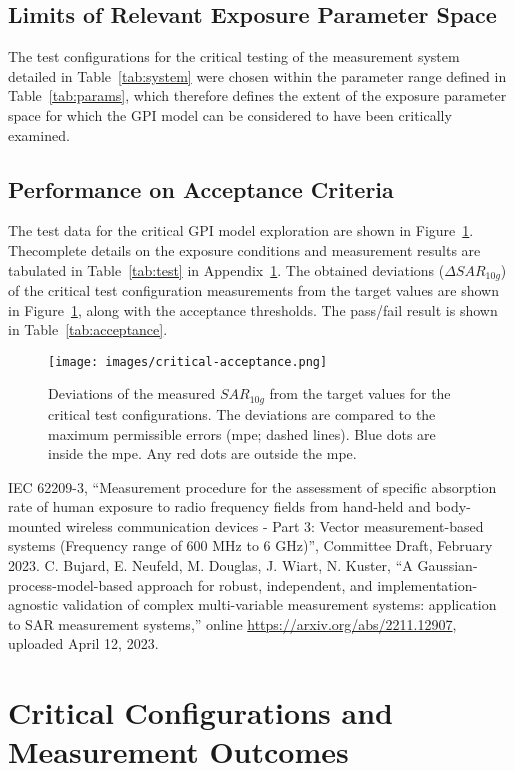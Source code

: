 \documentclass{article}
\begin{document}
\subsection{Limits of Relevant Exposure Parameter Space}
The test configurations for the critical testing of the measurement system detailed in Table~\ref{tab:system} were chosen within the parameter range defined in Table~\ref{tab:params}, which therefore defines the extent of the exposure parameter space for which the GPI model can be considered to have been critically examined.



\FloatBarrier
\subsection{Performance on Acceptance Criteria}
The test data for the critical GPI model exploration are shown in Figure~\ref{fig:critical-acc}. Thecomplete details on the exposure conditions and measurement results are tabulated in Table~\ref{tab:test} in Appendix~\ref{sec:critical-data}.
The obtained deviations ($\Delta SAR_{10g}$) of the critical test configuration measurements from the target values are shown in Figure~\ref{fig:critical-acc}, along with the acceptance thresholds. The pass/fail result is shown in Table~\ref{tab:acceptance}.



\begin{figure}[H] \centering
\texttt{[image: images/critical-acceptance.png]}
\caption{Deviations of the measured $SAR_{10g}$ from the target values for the critical test configurations. The deviations are compared to the maximum permissible errors (mpe; dashed lines). Blue dots are inside the mpe. Any red dots are outside the mpe.} \label{fig:critical-acc}
\end{figure}

\FloatBarrier

\newpage

\begin{thebibliography}{9}
IEC 62209-3, ``Measurement procedure for the assessment of specific absorption rate of human exposure to radio frequency fields from hand-held and body-mounted wireless communication devices - Part 3: Vector measurement-based systems (Frequency range of 600 MHz to 6 GHz)'', Committee Draft, February 2023.
C. Bujard, E. Neufeld, M. Douglas, J. Wiart, N. Kuster, ``A Gaussian-process-model-based approach for robust, independent, and implementation-agnostic validation of complex multi-variable measurement systems: application to SAR measurement systems,'' online \url{https://arxiv.org/abs/2211.12907}, uploaded April 12, 2023.
\end{thebibliography}

\FloatBarrier
\newpage
\appendix
\section{Critical Configurations and Measurement Outcomes} \label{sec:critical-data}


\end{document}
